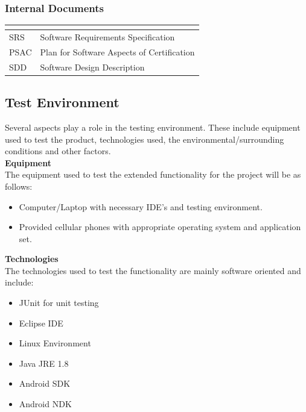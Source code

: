 \documentclass[11pt]{article}
\begin{document}
\subsubsection{Internal Documents}
\begin{tabular}{ll}
\textbf{}       & \textbf{}  \\ \hline
\multicolumn{1}{|L{2cm}|}{SRS} & \multicolumn{1}{L{10cm}|}{Software Requirements Specification} \\ \hline
\multicolumn{1}{|L{2cm}|}{PSAC} & \multicolumn{1}{L{10cm}|}{Plan for Software Aspects of Certification} \\ \hline
\multicolumn{1}{|L{2cm}|}{SDD} & \multicolumn{1}{L{10cm}|}{Software Design Description} \\ \hline
\end{tabular}

\subsection{Test Environment}
Several aspects play a role in the testing environment. These include equipment used to test the product, technologies used, the environmental/surrounding conditions and other factors.\\
\textbf{Equipment}\\
The equipment used to test the extended functionality for the project will be as follows:
\begin{itemize}
\item Computer/Laptop with necessary IDE's and testing environment.
\item Provided cellular phones with appropriate operating system and application set.
\end{itemize}
\textbf{Technologies}\\
The technologies used to test the functionality are mainly software oriented and include:
\begin{itemize}
\item JUnit for unit testing
\item Eclipse IDE
\item Linux Environment
\item Java JRE 1.8
\item Android SDK
\item Android NDK
\end{itemize}
\end{document}
